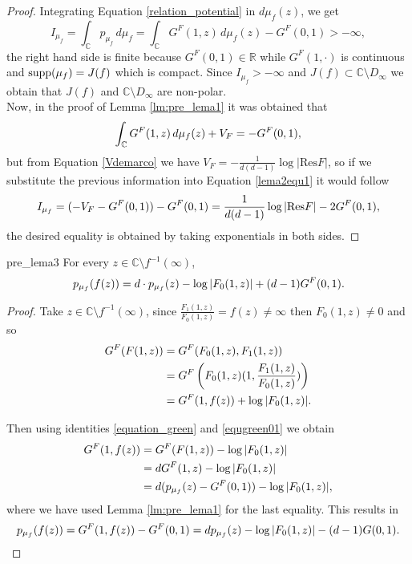 \begin{proof}
Integrating Equation \eqref{relation_potential} in $d\mu_f(z)$, we get
\begin{equation}\label{lema2equ1}
I_{\mu_f} = \int_{\mathbb{C}} p_{\mu_f} \,d\mu_f = \int_{\mathbb{C}} G^{F}(1,z)\,d\mu_f(z) - G^F(0,1)>-\infty,
\end{equation}
the right hand side is finite because $G^F(0,1)\in \mathbb{R}$ while $G^F(1,\cdot)$ is continuous and $\text{supp}(\mu_f) = J(f)$ which is compact. Since $I_{\mu_f}>-\infty$ and $J(f)\subset \mathbb{C}\setminus D_\infty$ we obtain that $J(f)$ and $\mathbb{C}\setminus D_\infty$ are non-polar.\\

Now, in the proof of Lemma \ref{lm:pre_lema1} it was obtained that
$$\int_{\mathbb{C}}G^F(1,z)\,d\mu_f(z)+V_F = -G^F (0,1),$$
but from Equation \eqref{Vdemarco} we have $V_F = -\frac{1}{d(d-1)} \log |\text{Res} F|$, so if we substitute the previous information into Equation \eqref{lema2equ1} it would follow
$$I_{\mu_f} = (-V_F-G^F(0,1)) - G^F(0,1) = \frac{1}{d(d-1)} \log |\text{Res} F| - 2G^F(0,1),$$
the desired equality is obtained by taking exponentials in both sides.
\end{proof}


\begin{mylema}{}{pre_lema3}
For every $z\in \mathbb{C} \setminus f^{-1}(\infty)$,
$$p_{\mu_f}(f(z)) = d\cdot p_{\mu_f}(z) - \log |F_0(1,z)| +(d-1)G^F(0,1).$$
\end{mylema}

\begin{proof}
Take $z\in \mathbb{C}\setminus f^{-1}(\infty)$, since $\frac{F_1(1,z)}{F_0(1,z)}=f(z)\neq \infty$ then $F_0(1,z) \neq 0$ and so
\begin{align*}
G^F(F(1,z)) &= G^F(F_0(1,z),F_1(1,z))\\
&= G^F\left(F_0(1,z) (1,\frac{F_1(1,z)}{F_0(1,z)})\right)\\
&= G^F(1,f(z))+\log|F_0(1,z)|.
\end{align*}

Then using identities \eqref{equation_green} and \eqref{equgreen01} we obtain
\begin{align*}
G^F(1,f(z)) &= G^F(F(1,z))-\log|F_0(1,z)|\\
&= dG^F(1,z)-\log|F_0(1,z)|\\
&= d(p_{\mu_f}(z)-G^F(0,1))-\log|F_0(1,z)|,
\end{align*}
where we have used Lemma \ref{lm:pre_lema1} for the last equality. This results in
$$p_{\mu_f}(f(z)) = G^F(1,f(z))-G^F(0,1) = dp_{\mu_f}(z)-\log|F_0(1,z)|-(d-1)G(0,1).$$
\end{proof}

